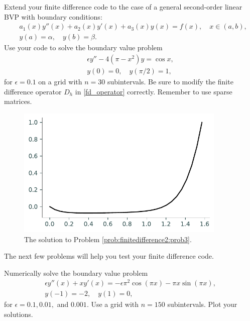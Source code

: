 \begin{problem}
Extend your finite difference code to the case of a general second-order linear BVP with boundary conditions:
\begin{align*}
	&{ } a_1(x)y''(x) +a_2(x)y'(x)+ a_3(x) y(x) = f(x), \quad x \in (a,b),\\
	&{ } y(a) = \alpha, \quad y(b) = \beta.
\end{align*}
Use your code to solve the boundary value problem
\begin{align*}
	\epsilon y'' - 4(\pi - x^2)y = \cos x, \\
	y(0) = 0, \quad y(\pi/2) = 1,
\end{align*}
for $\epsilon = 0.1$ on a grid with $n=30$ subintervals.
\label{prob:finitedifference2:prob3}
Be sure to modify the finite difference operator $D_h$ in \eqref{fd_operator} correctly.
Remember to use sparse matrices.

\end{problem}



\begin{figure}[h]
\centering
\includegraphics[width=10cm]{figures/figure3.pdf}
\caption{The solution to Problem \ref{prob:finitedifference2:prob3}.
}
\end{figure}


The next few problems will help you test your finite difference code.

\begin{problem}
Numerically solve the boundary value problem
\begin{align*}
	\epsilon y''(x) + xy'(x) = -\epsilon \pi^2 \cos(\pi x) - \pi x \sin(\pi x), \\
	y(-1) = -2, \quad y(1) = 0,
\end{align*}
for $\epsilon = 0.1, 0.01,$ and $0.001$.
Use a grid with $n=150$ subintervals.
Plot your solutions.
\label{prob:finitedifference2:prob4}
\end{problem}

